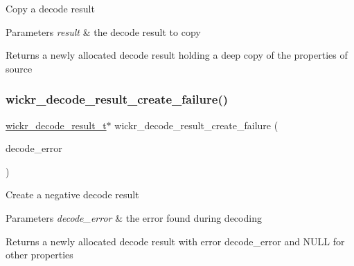 Copy a decode result


\begin{DoxyParams}{Parameters}
{\em result} & the decode result to copy \\
\hline
\end{DoxyParams}
\begin{DoxyReturn}{Returns}
a newly allocated decode result holding a deep copy of the properties of \textquotesingle{}source\textquotesingle{} 
\end{DoxyReturn}
\mbox{\label{group__wickr__protocol_ga2bd6f49ed993d2290aaafa514eba43ed}} 
\subsubsection{\texorpdfstring{wickr\+\_\+decode\+\_\+result\+\_\+create\+\_\+failure()}{wickr\_decode\_result\_create\_failure()}}
{\footnotesize\ttfamily \hyperlink{structwickr__decode__result}{wickr\+\_\+decode\+\_\+result\+\_\+t}$\ast$ wickr\+\_\+decode\+\_\+result\+\_\+create\+\_\+failure (\begin{DoxyParamCaption}\item[{wickr\+\_\+decode\+\_\+error}]{decode\+\_\+error }\end{DoxyParamCaption})}

Create a negative decode result


\begin{DoxyParams}{Parameters}
{\em decode\+\_\+error} & the error found during decoding \\
\hline
\end{DoxyParams}
\begin{DoxyReturn}{Returns}
a newly allocated decode result with error \textquotesingle{}decode\+\_\+error\textquotesingle{} and N\+U\+LL for other properties 
\end{DoxyReturn}
\mbox{\label{group__wickr__protocol_ga633aaf4cb6159be0110401f06dae458c}} 
